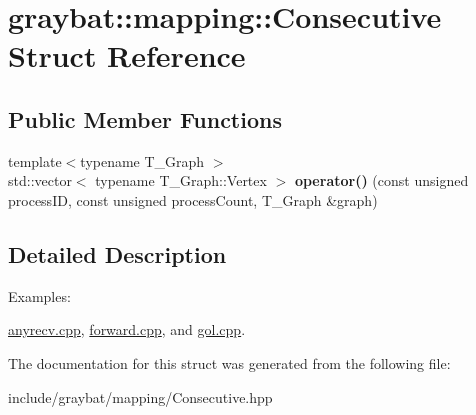 \hypertarget{structgraybat_1_1mapping_1_1Consecutive}{}\section{graybat\+:\+:mapping\+:\+:Consecutive Struct Reference}
\label{structgraybat_1_1mapping_1_1Consecutive}
\subsection*{Public Member Functions}
\begin{DoxyCompactItemize}
\item 
\hypertarget{structgraybat_1_1mapping_1_1Consecutive_a723a783f1ab47359c81521183f97b302}{}{\footnotesize template$<$typename T\+\_\+\+Graph $>$ }\\std\+::vector$<$ typename T\+\_\+\+Graph\+::\+Vertex $>$ {\bfseries operator()} (const unsigned process\+I\+D, const unsigned process\+Count, T\+\_\+\+Graph \&graph)\label{structgraybat_1_1mapping_1_1Consecutive_a723a783f1ab47359c81521183f97b302}

\end{DoxyCompactItemize}


\subsection{Detailed Description}
\begin{Desc}
\item[Examples\+: ]\par
\hyperlink{anyrecv_8cpp-example}{anyrecv.\+cpp}, \hyperlink{forward_8cpp-example}{forward.\+cpp}, and \hyperlink{gol_8cpp-example}{gol.\+cpp}.\end{Desc}


The documentation for this struct was generated from the following file\+:\begin{DoxyCompactItemize}
\item 
include/graybat/mapping/Consecutive.\+hpp\end{DoxyCompactItemize}
